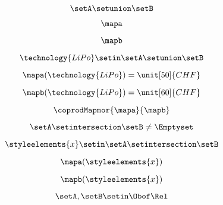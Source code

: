 \begin{forslides}
    \begin{equation}
        \label{eq:feedback-108}
        \setA\setunion \setB
    \end{equation}

    \begin{equation}
        \label{eq:feedback-109}
        \mapa
    \end{equation}

    \begin{equation}
        \label{eq:feedback-110}
        \mapb
    \end{equation}

    \begin{equation}
        \label{eq:feedback-111}
        \technology{LiPo}\setin \setA\setunion \setB
    \end{equation}

    \begin{equation}
        \label{eq:feedback-112}
        \mapa(\technology{LiPo})=\unit[50]{CHF}
    \end{equation}

    \begin{equation}
        \label{eq:feedback-113}
        \mapb(\technology{LiPo})=\unit[60]{CHF}
    \end{equation}

    \begin{equation}
        \label{eq:feedback-114}
        \coprodMapmor{\mapa}{\mapb}
    \end{equation}

    \begin{equation}
        \label{eq:feedback-115}
        \setA\setintersection \setB\neq \Emptyset
    \end{equation}

    \begin{equation}
        \label{eq:feedback-116}
        \styleelements{x}\setin \setA\setintersection \setB
    \end{equation}

    \begin{equation}
        \label{eq:feedback-117}
        \mapa(\styleelements{x})
    \end{equation}

    \begin{equation}
        \label{eq:feedback-118}
        \mapb(\styleelements{x})
    \end{equation}

    \begin{equation}
        \label{eq:feedback-119}
        \setA,\setB\setin \Obof\Rel
    \end{equation}


\end{forslides}
